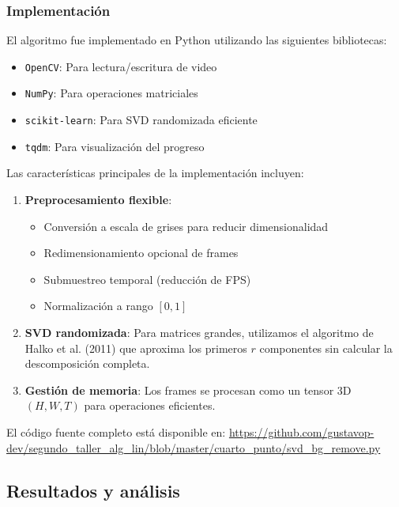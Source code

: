 \documentclass[12pt]{article}
\begin{document}
\subsubsection{Implementación}

El algoritmo fue implementado en Python utilizando las siguientes bibliotecas:
\begin{itemize}
    \item \texttt{OpenCV}: Para lectura/escritura de video
    \item \texttt{NumPy}: Para operaciones matriciales
    \item \texttt{scikit-learn}: Para SVD randomizada eficiente
    \item \texttt{tqdm}: Para visualización del progreso
\end{itemize}

Las características principales de la implementación incluyen:

\begin{enumerate}
    \item \textbf{Preprocesamiento flexible}:
    \begin{itemize}
        \item Conversión a escala de grises para reducir dimensionalidad
        \item Redimensionamiento opcional de frames
        \item Submuestreo temporal (reducción de FPS)
        \item Normalización a rango $[0,1]$
    \end{itemize}
    
    \item \textbf{SVD randomizada}: Para matrices grandes, utilizamos el algoritmo de Halko et al. (2011) que aproxima los primeros $r$ componentes sin calcular la descomposición completa.
    
    \item \textbf{Gestión de memoria}: Los frames se procesan como un tensor 3D $(H, W, T)$ para operaciones eficientes.
\end{enumerate}

El código fuente completo está disponible en: \url{https://github.com/gustavop-dev/segundo_taller_alg_lin/blob/master/cuarto_punto/svd_bg_remove.py}

\subsection{Resultados y análisis}
\end{document}
